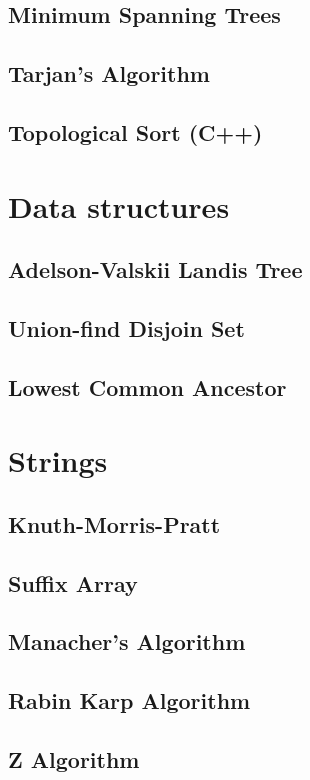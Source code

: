 \subsection{Minimum Spanning Trees}
\raggedbottom
\hrulefill
\subsection{Tarjan's Algorithm}
\raggedbottom
\hrulefill
\subsection{Topological Sort (C++)}
\raggedbottom
\hrulefill

\section{Data structures}
\subsection{Adelson-Valskii Landis Tree}
\raggedbottom
\hrulefill
\subsection{Union-find Disjoin Set}
\raggedbottom
\hrulefill
\subsection{Lowest Common Ancestor}
\raggedbottom
\hrulefill

\section{Strings}
\subsection{Knuth-Morris-Pratt}
\raggedbottom
\hrulefill
\subsection{Suffix Array}
\raggedbottom
\hrulefill
\subsection{Manacher's Algorithm}
\raggedbottom
\hrulefill
\subsection{Rabin Karp Algorithm}
\raggedbottom
\hrulefill
\vfill
\columnbreak
\subsection{Z Algorithm}
\raggedbottom
\hrulefill

